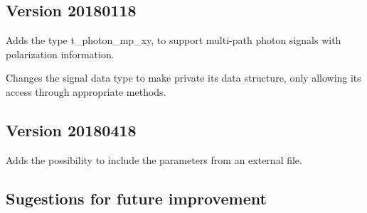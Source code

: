 %
%
%
%
%
%
%
%
%

\subsection{ Version 20180118}

Adds the type t\_photon\_mp\_xy, to support multi-path photon signals with polarization information.

Changes the signal data type to make private its data structure, only allowing its access through appropriate methods.

\subsection{ Version 20180418}

Adds the possibility to include the parameters from an external file.

\subsection*{Sugestions for future improvement}
